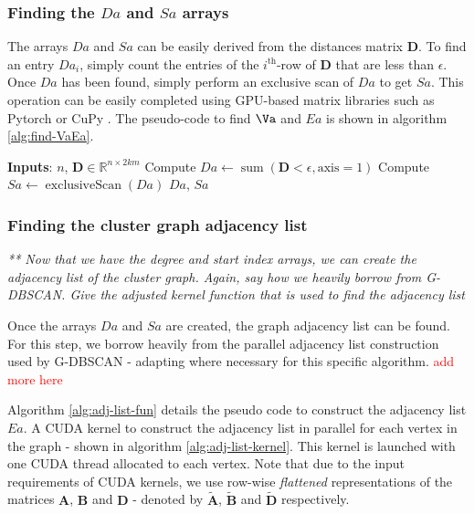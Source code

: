 \documentclass{article}
\newcommand\todo[1]{\textcolor{red}{#1}}
\newcommand{\eps}{\epsilon}
\newcommand{\bA}{\mathbf{A}}
\newcommand{\bB}{\mathbf{B}}
\newcommand{\bD}{\mathbf{D}}
\newcommand{\bAt}{\widetilde{\mathbf{A}}}
\newcommand{\bBt}{\widetilde{\mathbf{B}}}
\newcommand{\bDt}{\widetilde{\mathbf{D}}}
\newcommand{\Real}{\mathbb{R}}
\newcommand{\Da}{\textit{Da}}
\newcommand{\Sa}{\textit{Sa}}
\newcommand{\Ea}{\textit{Ea}}
\begin{document}
\subsubsection{Finding the $\Da$ and $\Sa$ arrays}

The arrays $\Da$ and $\Sa$ can be easily derived from the distances matrix $\bD$. To find an entry $\Da_i$, simply count the entries of the $i^{\text{th}}$-row of $\bD$ that are less than $\eps$. Once $\Da$ has been found, simply perform an exclusive scan \cite{harris2007parallel} of $\Da$ to get $\Sa$. This operation can be easily completed using GPU-based matrix libraries such as Pytorch \cite{Ansel_PyTorch_2_Faster_2024} or CuPy \cite{cupy_learningsys2017}. The pseudo-code to find $\Va$ and $\Ea$ is shown in algorithm \ref{alg:find-VaEa}.

\begin{algorithm}
    \caption{Finding the arrays $\Da$ and $\Sa$}
    \begin{algorithmic}[1]
        \State \textbf{Inputs}: $n$, $\bD \in \Real^{n \times 2km}$
        \State Compute $\Da \gets \operatorname{sum}(\bD < \eps, \text{axis}=1)$ \Comment{Reduction sum across the rows of $\bD$}
        \State Compute $\Sa \gets \operatorname{exclusiveScan}(\Da)$ 
        \State \Return $\Da$, $\Sa$
    \end{algorithmic}
    \label{alg:find-VaEa}
\end{algorithm}

\subsubsection{Finding the cluster graph adjacency list}

\textit{** Now that we have the degree and start index arrays, we can create the adjacency list of the cluster graph. Again, say how we heavily borrow from G-DBSCAN. Give the adjusted kernel function that is used to find the adjacency list}

Once the arrays $\Da$ and $\Sa$ are created, the graph adjacency list can be found. For this step, we borrow heavily from the parallel adjacency list construction used by G-DBSCAN \cite{G_DBSCAN} - adapting where necessary for this specific algorithm. \todo{add more here}

Algorithm \ref{alg:adj-list-fun} details the pseudo code to construct the adjacency list $\Ea$. A CUDA kernel to construct the adjacency list in parallel for each vertex in the graph - shown in algorithm \ref{alg:adj-list-kernel}. This kernel is launched with one CUDA thread allocated to each vertex. Note that due to the input requirements of CUDA kernels, we use row-wise \textit{flattened} representations of the matrices $\bA$, $\bB$ and $\bD$ - denoted by $\bAt$, $\bBt$ and $\bDt$ respectively. 
\end{document}
